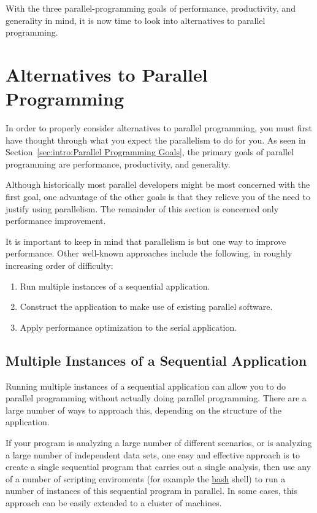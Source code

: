 With the three parallel-programming goals of performance, productivity, 
and generality in mind, it is now time to look into alternatives to
parallel programming.

\section{Alternatives to Parallel Programming}
\label{sec:intro:Alternatives to Parallel Programming}

In order to properly consider alternatives to parallel programming,
you must first have thought through what you expect the parallelism
to do for you.
As seen in Section~\ref{sec:intro:Parallel Programming Goals},
the primary goals of parallel programming are performance, productivity,
and generality.

Although historically most parallel developers might be most concerned
with the first goal,
one advantage of the other goals is that they relieve you of the need
to justify using parallelism.
The remainder of this section is concerned only performance improvement.

It is important to keep in mind that parallelism is but one way to
improve performance.
Other well-known approaches include the following, in roughly increasing
order of difficulty:

\begin{enumerate}
\item	Run multiple instances of a sequential application.
\item	Construct the application to make use of existing parallel software.
\item	Apply performance optimization to the serial application.
\end{enumerate}

\subsection{Multiple Instances of a Sequential Application}
\label{sec:intro:Multiple Instances of a Sequential Application}

Running multiple instances of a sequential application can allow you
to do parallel programming without actually doing parallel programming.
There are a large number of ways to approach this, depending on the
structure of the application.

If your program is analyzing a large number of different scenarios,
or is analyzing a large number of independent data sets, one easy
and effective approach is to create a single sequential program that
carries out a single analysis, then use any of a number of scripting
enviroments (for example the \url{bash} shell) to run a number of
instances of this sequential program in parallel.
In some cases, this approach can be easily extended to a cluster of
machines.

